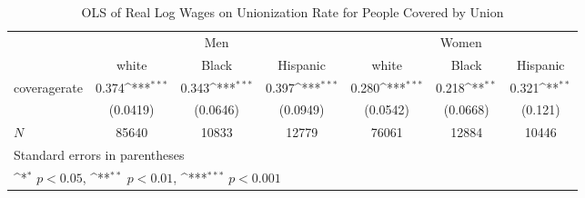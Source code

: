 \begin{table}[htbp]\centering
\def\sym#1{\ifmmode^{#1}\else\(^{#1}\)\fi}
\caption{OLS of Real Log Wages on Unionization Rate for People Covered by Union}
\begin{tabular}{l*{6}{c}}
\hline\hline
            &\multicolumn{3}{c}{Men}                                          &\multicolumn{3}{c}{Women}                                        \\\cmidrule(lr){2-4}\cmidrule(lr){5-7}
            &\multicolumn{1}{c}{white}&\multicolumn{1}{c}{Black}&\multicolumn{1}{c}{Hispanic}&\multicolumn{1}{c}{white}&\multicolumn{1}{c}{Black}&\multicolumn{1}{c}{Hispanic}\\
\hline
coveragerate&       0.374\sym{***}&       0.343\sym{***}&       0.397\sym{***}&       0.280\sym{***}&       0.218\sym{**} &       0.321\sym{**} \\
            &    (0.0419)         &    (0.0646)         &    (0.0949)         &    (0.0542)         &    (0.0668)         &     (0.121)         \\
\hline
\(N\)       &       85640         &       10833         &       12779         &       76061         &       12884         &       10446         \\
\hline\hline
\multicolumn{7}{l}{\footnotesize Standard errors in parentheses}\\
\multicolumn{7}{l}{\footnotesize \sym{*} \(p<0.05\), \sym{**} \(p<0.01\), \sym{***} \(p<0.001\)}\\
\end{tabular}
\end{table}
